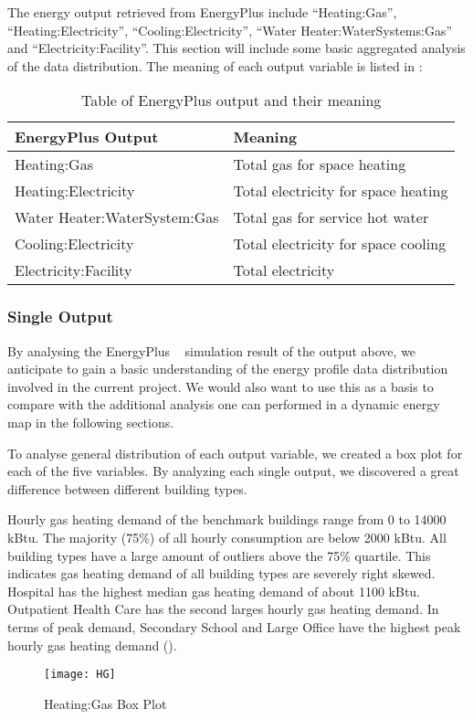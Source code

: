 The energy output retrieved from EnergyPlus include ``Heating:Gas'',
``Heating:Electricity'', ``Cooling:Electricity'', ``Water
Heater:WaterSystems:Gas'' and ``Electricity:Facility''. This section
will include some basic aggregated analysis of the data distribution.
The meaning of each output variable is listed in
:
\begin{table}[h!]
\centering
\caption{Table of EnergyPlus output and their meaning}
\label{tab:outputMeaning}
\begin{tabular}{l|l}
  \hline
EnergyPlus Output            & Meaning\\
  \hline
  \hline
Heating:Gas                  & Total gas for space heating         \\
Heating:Electricity          & Total electricity for space heating \\
Water Heater:WaterSystem:Gas & Total gas for service hot water     \\
Cooling:Electricity          & Total electricity for space cooling \\
Electricity:Facility         & Total electricity                  \\
  \hline
\end{tabular}
\end{table}

\subsubsection{Single Output}
By analysing the EnergyPlus ~\cite{EnergyPlus2015} simulation result
of the output above, we anticipate to gain a basic understanding of
the energy profile data distribution involved in the current
project. We would also want to use this as a basis to compare with the
additional analysis one can performed in a dynamic energy map in the
following sections.

To analyse general distribution of each output variable, we created a
box plot for each of the five variables. By analyzing each single
output, we discovered a great difference between different building
types. 

Hourly gas heating demand of the benchmark buildings range from 0 to
14000 kBtu. The majority (75\%) of all hourly consumption are below
2000 kBtu. All building types have a large amount of outliers above
the 75\% quartile. This indicates gas heating demand of all building
types are severely right skewed. Hospital has the highest median gas
heating demand of about 1100 kBtu. Outpatient Health Care has the
second larges hourly gas heating demand. In terms of peak demand,
Secondary School and Large Office have the highest peak hourly gas
heating demand ().
\begin{figure}[h!]
  \centering
  \texttt{[image: HG]}
  \caption[Heating:Gas Box Plot]{Heating:Gas Box Plot}
  \label{fig:HG}
\end{figure}%

